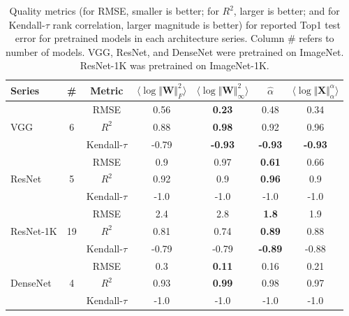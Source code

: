 \begin{table}[t]
\small
\begin{center}
\begin{tabular}{|p{1in}|c|c|c|c|c|c|}
\hline
 Series                      & \#                    & Metric         & $\langle\log\Vert\mathbf{W}\Vert^{2}_{F}\rangle$ & $\langle\log\Vert\mathbf{W}\Vert^{2}_{\infty}\rangle$ & $\hat{\alpha}$ & $\langle\log\Vert\mathbf{X}\Vert^{\alpha}_{\alpha}\rangle$ \\
\hline
\multirow{3}{4em}{VGG}       & \multirow{3}{1em}{6}  & RMSE           & 0.56 & \textbf{0.23} & 0.48          & 0.34  \\
                             &                       & $R^2$          & 0.88 & \textbf{0.98} &  0.92         &  0.96           \\
                             &                       & Kendall-$\tau$ & -0.79 &  \textbf{-0.93} & \textbf{-0.93} & \textbf{-0.93}        \\
\hline
\multirow{3}{4em}{ResNet}    & \multirow{3}{1em}{5}  & RMSE           &  0.9 & 0.97 & \textbf{0.61} & 0.66        \\
                             &                       & $R^2$          &  0.92 &  0.9 &  \textbf{0.96}   &  0.9         \\
                             &                       & Kendall-$\tau$ &  -1.0 &  -1.0 &  -1.0          &  -1.0        \\
\hline
\multirow{3}{4em}{ResNet-1K} & \multirow{3}{1em}{19} & RMSE           &  2.4 & 2.8  & \textbf{1.8}  & 1.9          \\
                             &                       & $R^2$          &  0.81 &  0.74 &  \textbf{0.89}    &  0.88           \\
                             &                       & Kendall-$\tau$ &  -0.79 &  -0.79 &  \textbf{-0.89}  &  -0.88           \\
\hline
\multirow{3}{4em}{DenseNet}  & \multirow{3}{1em}{4}  & RMSE           &  0.3 & \textbf{0.11}  & 0.16 & 0.21       \\
                             &                       & $R^2$          &  0.93 &  \textbf{0.99} &  0.98      &  0.97    \\
                             &                       & Kendall-$\tau$ &  -1.0 &  -1.0 &  -1.0         &  -1.0     \\
\hline
\end{tabular}
\end{center}
\caption{Quality metrics 
         (for RMSE, smaller is better; for $R^2$, larger is better; and for Kendall-$\tau$ rank correlation, larger magnitude is better)
         for reported Top1 test error for pretrained models in each architecture series.  
         Column \# refers to number of models.  
         VGG, ResNet, and DenseNet were pretrained on ImageNet.  
         ResNet-1K was pretrained on ImageNet-1K. 
}
\label{table:cv-models}
\end{table}

